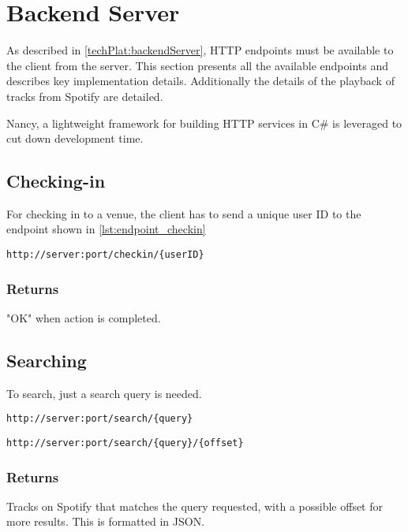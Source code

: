 \section{Backend Server}
\label{imp:backendServer}

As described in \cref{techPlat:backendServer}, HTTP endpoints must be
available to the client from the server. This section presents all the
available endpoints and describes key implementation
details. Additionally the details of the playback of tracks from
Spotify are detailed.

Nancy, a lightweight framework for building HTTP services in C\# is leveraged
to cut down development time.

\subsection{Checking-in}
For checking in to a venue, the client has to send a unique user ID to
the endpoint shown in \cref{lst:endpoint_checkin}

\begin{lstlisting}[label={lst:endpoint_checkin}, caption={HTTP endpoint allowing client to check-in to a venue. Text surrounded by curly brackets are parameters.}]
http://server:port/checkin/{userID}
\end{lstlisting}

\subsubsection{Returns}
"OK" when action is completed.

\subsection{Searching}
To search, just a search query is needed.

\begin{lstlisting}[label={lst:endpoint_search}, caption={Text surrounded by curly brackets are parameters.}]
http://server:port/search/{query}
\end{lstlisting}

\begin{lstlisting}[label={lst:endpoint_search_offset}, caption={Text surrounded by curly brackets are parameters.}]
http://server:port/search/{query}/{offset}
\end{lstlisting}

\subsubsection{Returns}
Tracks on Spotify that matches the query requested, with a possible offset for more results. This is formatted in JSON.

